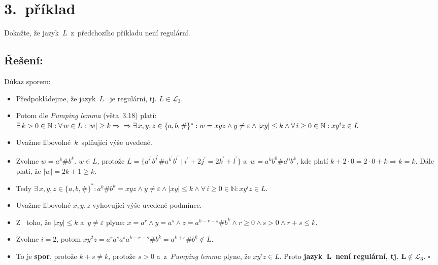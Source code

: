 \documentclass[a4paper, 11pt]{scrartcl}
\newcommand*{\QEDB}{\hfill\ensuremath{\square}}
\begin{document}
    \section*{3.~příklad}

    Dokažte, že jazyk~$ L $~z~předchozího příkladu není regulární.

    \subsection*{Řešení:}

    Důkaz sporem:
    \begin{itemize}
        \item
            Předpokládejme, že jazyk~$ L $~ je regulární, tj. $ L \in
            \mathcal{L}_3$.

        \item
            Potom dle \emph{Pumping lemma} (věta~3.18) platí: \\
            $ \exists\,k > 0 \in \mathbb{N}: \forall\,w \in L: |w| \geq k
            \Rightarrow \\ \Rightarrow \exists\,x, y, z \in \{a, b, \#\}^*:
            w = xyz \wedge y \neq \varepsilon \wedge |xy| \leq k \wedge
            \forall\,i \geq 0 \in \mathbb{N}: xy^iz \in L $

        \item
            Uvažme libovolné~$ k $~splňující výše uvedené.

        \item
            Zvolme $ w = a^k\#b^k $. $ w \in L $, protože $ L = \{a^{i^\prime}%
            b^{j^\prime}\#a^{k^\prime}b^{l^\prime}\ |\ i^\prime + 2j^\prime =
            2k^\prime + l^\prime\} $ a~$ w = a^kb^0\#a^0b^k $, kde platí
            $ k + 2 \cdot 0 = 2 \cdot 0 + k \Rightarrow k = k $. Dále
            platí, že $ |w| = 2k + 1 \geq k $.

        \item
            Tedy $ \exists\,x, y, z \in \{a, b, \#\}^*: a^k\#b^k = xyz \wedge
            y \neq \varepsilon \wedge |xy| \leq k \wedge \forall\,i \geq 0 \in
            \mathbb{N}: xy^iz \in L $.

        \item
            Uvažme libovolné $ x, y, z $ vyhovující výše uvedené podmínce.

        \item
            Z~ toho, že $ |xy| \leq k $ a~$ y \neq \varepsilon $ plyne:
            $ x = a^r \wedge y = a^s \wedge z = a^{k-r-s}\#b^k \wedge
            r \geq 0 \wedge s > 0 \wedge r + s \leq k$.

        \item
            Zvolme $ i = 2 $, potom $ xy^2z = a^ra^sa^sa^{k-r-s}\#b^k =
            a^{k+s}\#b^k \notin L $.

        \item
            To je \textbf{spor}, protože $ k + s \neq k $, protože $ s > 0 $
            a~z~\emph{Pumping lemma} plyne, že $ xy^iz \in L $. Proto
            \textbf{jazyk~$ \mathbf{L} $~není regulární, tj. $ \mathbf{L
            \notin \mathcal{L}_3} $}. \QEDB
    \end{itemize}
\end{document}

